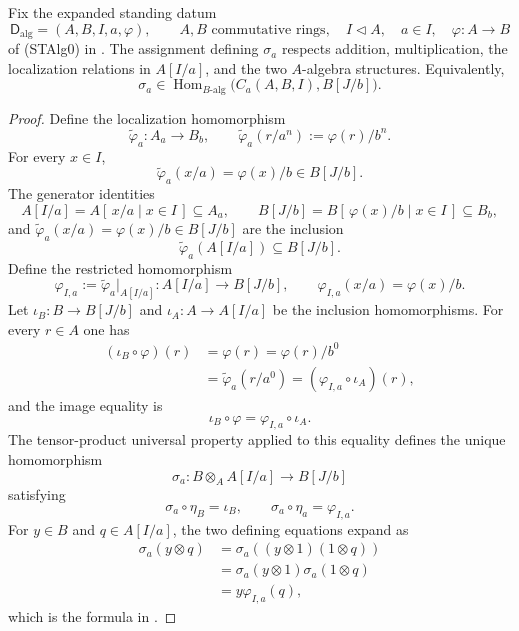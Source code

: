 \begin{lemma}
  \label{lemma:nagata-strict-chart-to-extended-blowup-chart}
  \lean{}

  Fix the expanded standing datum
  \[
    \mathsf D_{\mathrm{alg}}=(A,B,I,a,\varphi),\qquad
    A,B\text{ commutative rings},\quad
    I\triangleleft A,\quad a\in I,\quad
    \varphi\colon A\to B
  \]
  of (STAlg0) in
  .
  The assignment defining $\sigma_a$ respects addition, multiplication, the
  localization relations in $A[I/a]$, and the two $A$-algebra structures.
  Equivalently,
  \[
    \sigma_a\in
      \operatorname{Hom}_{B\text{-alg}}
        \bigl(C_a(A,B,I),B[J/b]\bigr).
  \]
\end{lemma}

\begin{proof}
  Define the localization homomorphism
  \[
    \widetilde\varphi_a\colon A_a\longrightarrow B_b,
    \qquad
    \widetilde\varphi_a(r/a^n):=\varphi(r)/b^n.
  \]
  For every $x\in I$,
  \[
    \widetilde\varphi_a(x/a)=\varphi(x)/b\in B[J/b].
  \]
  The generator identities
  \[
    A[I/a]=A[\,x/a\mid x\in I\,]\subseteq A_a,
    \qquad
    B[J/b]=B[\,\varphi(x)/b\mid x\in I\,]\subseteq B_b,
  \]
  and
  $\widetilde\varphi_a(x/a)=\varphi(x)/b\in B[J/b]$ are the inclusion
  \[
    \widetilde\varphi_a(A[I/a])\subseteq B[J/b].
  \]
  Define the restricted homomorphism
  \[
    \varphi_{I,a}
      :=\widetilde\varphi_a|_{A[I/a]}
      \colon A[I/a]\longrightarrow B[J/b],
    \qquad
    \varphi_{I,a}(x/a)=\varphi(x)/b.
  \]
  Let $\iota_B\colon B\to B[J/b]$ and
  $\iota_A\colon A\to A[I/a]$ be the inclusion homomorphisms.  For every
  $r\in A$ one has
  \[
  \begin{aligned}
    (\iota_B\circ\varphi)(r)
      &=\varphi(r)
       =\varphi(r)/b^0\\
      &=\widetilde\varphi_a(r/a^0)
       =(\varphi_{I,a}\circ\iota_A)(r),
  \end{aligned}
  \]
  and the image equality is
  \[
    \iota_B\circ\varphi=\varphi_{I,a}\circ\iota_A.
  \]
  The tensor-product universal property applied to this equality defines the
  unique homomorphism
  \[
    \sigma_a\colon B\otimes_AA[I/a]\longrightarrow B[J/b]
  \]
  satisfying
  \[
    \sigma_a\circ\eta_B=\iota_B,
    \qquad
    \sigma_a\circ\eta_a=\varphi_{I,a}.
  \]
  For $y\in B$ and $q\in A[I/a]$, the two defining equations expand as
  \[
  \begin{aligned}
    \sigma_a(y\otimes q)
      &=\sigma_a((y\otimes1)(1\otimes q))\\
      &=\sigma_a(y\otimes1)\sigma_a(1\otimes q)\\
      &=y\varphi_{I,a}(q),
  \end{aligned}
  \]
  which is the formula in
  .
\end{proof}

